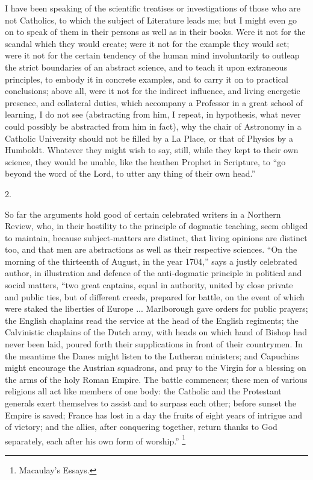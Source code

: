 I have been speaking of the scientific treatises or investigations
of those who are not Catholics, to which the subject of Literature
leads me; but I might even go on to speak of them in their persons as
well as in their books. Were it not for the scandal which they would
create; were it not for the example they would set; were it not for
the certain tendency of the human mind involuntarily to outleap the
strict boundaries of an abstract science, and to teach it upon
extraneous principles, to embody it in concrete examples, and to carry
it on to practical conclusions; above all, were it not for the
indirect influence, and living energetic presence, and collateral
duties, which accompany a Professor in a great school of learning, I
do not see (abstracting from him, I repeat, in hypothesis, what
never could possibly be abstracted from him in fact), why the chair of
Astronomy in a Catholic University should not be filled by a La Place,
or that of Physics by a Humboldt. Whatever they might wish to say,
still, while they kept to their own science, they would be unable,
like the heathen Prophet in Scripture, to ``go beyond the word of
the Lord, to utter any thing of their own head.''

2.

So far the arguments hold good of certain celebrated writers in a
Northern Review, who, in their hostility to the principle of dogmatic
teaching, seem obliged to maintain, because subject-matters are
distinct, that living opinions are distinct too, and that men are
abstractions as well as their respective sciences. ``On the
morning of the thirteenth of August, in the year 1704,'' says a
justly celebrated author, in illustration and defence of the
anti-dogmatic principle in political and social matters, ``two
great captains, equal in authority, united by close private and public
ties, but of different creeds, prepared for battle, on the event of
which were staked the liberties of Europe ... Marlborough gave orders
for public prayers; the English chaplains read the service at the head
of the English regiments; the Calvinistic chaplains of the Dutch army,
with heads on which hand of Bishop had never been laid, poured forth
their supplications in front of their countrymen. In the meantime the
Danes might listen to the Lutheran ministers; and Capuchins might
encourage the Austrian squadrons, and pray to the Virgin for a
blessing on the arms of the holy Roman Empire. The battle commences;
these men of various religions all act like members of one body: the
Catholic and the Protestant generals exert themselves to assist
and to surpass each other; before sunset the Empire is saved; France
has lost in a day the fruits of eight years of intrigue and of
victory; and the allies, after conquering together, return thanks to
God separately, each after his own form of worship.'' \footnote{Macaulay's
Essays.}

